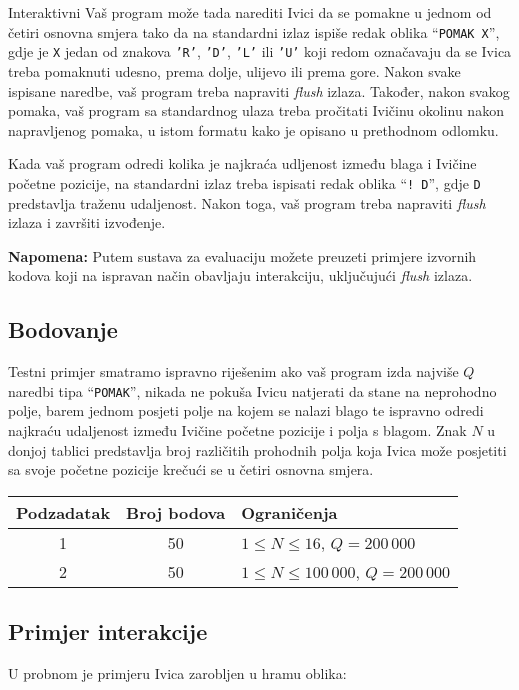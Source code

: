 \begin{statement}[
  problempoints=100,
  timelimit=5 sekundi,
  memorylimit=512 MiB,
]{Interaktivni}
Vaš program može tada narediti Ivici da se pomakne u jednom od četiri osnovna
smjera tako da na standardni izlaz ispiše redak oblika ``\texttt{POMAK X}'',
gdje je \texttt{X} jedan od znakova \texttt{'R'}, \texttt{'D'}, \texttt{'L'}
ili \texttt{'U'} koji redom označavaju da se Ivica treba pomaknuti udesno,
prema dolje, ulijevo ili prema gore. Nakon svake ispisane naredbe, vaš
program treba napraviti \textit{flush} izlaza. Također, nakon svakog pomaka,
vaš program sa standardnog ulaza treba pročitati Ivičinu okolinu nakon
napravljenog pomaka, u istom formatu kako je opisano u prethodnom odlomku.

Kada vaš program odredi kolika je najkraća udljenost između blaga i Ivičine
početne pozicije, na standardni izlaz treba ispisati redak oblika
``\texttt{\frenchspacing! D}'', gdje \texttt{D} predstavlja traženu
udaljenost. Nakon toga, vaš program treba napraviti \textit{flush} izlaza i
završiti izvođenje.

\textbf{Napomena:} Putem sustava za evaluaciju možete preuzeti primjere
izvornih kodova koji na ispravan način obavljaju interakciju, uključujući
\textit{flush} izlaza.

\subsection*{Bodovanje}
Testni primjer smatramo ispravno riješenim ako vaš program izda najviše $Q$
naredbi tipa ``\texttt{POMAK}'', nikada ne pokuša Ivicu natjerati da stane na
neprohodno polje, barem jednom posjeti polje na kojem se nalazi blago te
ispravno odredi najkraću udaljenost između Ivičine početne pozicije i polja s
blagom. Znak $N$ u donjoj tablici predstavlja broj različitih prohodnih polja
koja Ivica može posjetiti sa svoje početne pozicije krečući se u četiri osnovna
smjera.

{\renewcommand{\arraystretch}{1.4}
  \setlength{\tabcolsep}{6pt}
  \begin{tabular}{ccl}
 Podzadatak & Broj bodova & Ograničenja \\ \midrule
  1 & 50 & $1 \le N \le 16$, $Q = 200\,000$\\
  2 & 50 & $1 \le N \le 100\,000$, $Q = 200\,000$\\
\end{tabular}}

\subsection*{Primjer interakcije}
U probnom je primjeru Ivica zarobljen u hramu oblika:


\end{statement}
